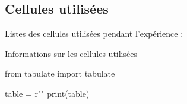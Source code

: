 \subsection{Cellules utilisées}

Listes des cellules utilisées pendant l'expérience : 

\begin{table}[h]
\caption{Informations sur les cellules utilisées}
\begin{pycode}

from tabulate import tabulate

table = r""
print(table)
\end{pycode}
\label{table-ensemencement}
\end{table}